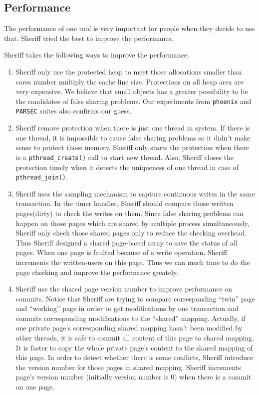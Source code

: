 \label{sec:discussion}

\subsection{Performance}
\label{discussion-perf}
The performance of one tool is very important for people when they decide to use that.
Sheriff tried the best to improve the performance.

Sheriff takes the following ways to improve the performance. 
\begin{enumerate}
\item
Sheriff only use the protected heap to meet those allocations smaller than 
cores number multiply the cache line size. 
Protections on all heap area are very expensive. 
We believe that small objects has a greater
possibility to be the candidates of false sharing problems. 
Our experiments from \texttt{phoenix} and \texttt{PARSEC} suites also confirms our guess. 

\item 
Sheriff remove protection when there is just one thread in system. If there is one thread, 
it is impossible to cause false sharing problems so it didn't make sense to protect those 
memory. Sheriff only starts the protection when there is a \texttt{pthread\_create()} call 
to start new thread. Also, Sheriff closes the protection
timely when it detects the uniqueness of one thread in case of \texttt{pthread\_join()}.

\item
Sheriff uses the sampling mechanism to capture continuous writes in the same transaction. 
In the timer handler, Sheriff should compare those written pages(dirty) to check the writes
on them. Since false sharing problems can happen on those pages which are shared by multiple process
simultaneously, Sheriff only check those shared pages only to reduce the checking overhead. 
Thus Sheriff designed a shared page-based array to save the status of 
all pages. When one page is faulted because of a write operation, Sheriff increments the written-users
on this page.
Thus we can much time to do the page checking and improve the performance greately.


\item 
Sheriff use the shared page version number to improve performance on commits. 
Notice that Sheriff are trying to compare corresponding ``twin'' page and ``working'' page 
in order to get modifications by one transaction and 
commits corresponding modifications to the ``shared'' mapping.
Actually, if one private page's corresponding shared mapping hasn't been modified by other threads, 
it is safe to commit all content of this page to shared mapping. It is faster to copy 
the whole private page's content to the shared mapping of this page. 
In order to detect whether there is some conflicts, Sheriff introduce the version number for those pages in shared mapping.
Sheriff increments page's version number (initially version number is 0) when there is a commit on 
one page. 


\end{enumerate}
